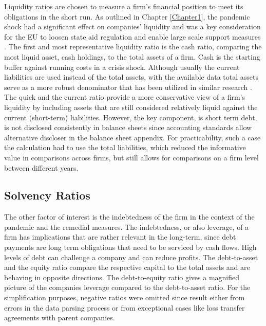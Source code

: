 Liquidity ratios are chosen to measure a firm's financial position to meet its obligations in the short run. As outlined in Chapter \ref{Chapter1}, the pandemic shock had a significant effect on companies' liquidity and was a key consideration for the EU to loosen state aid regulation and enable large scale support measures \parencite{eu_com_temporary_2020}. The first and most representative liquidity ratio is the cash ratio, comparing the most liquid asset, cash holdings, to the total assets of a firm. Cash is the starting buffer against running costs in a crisis shock. Although usually the current liabilities are used instead of the total assets, with the available data total assets serve as a more robust denominator that has been utilized in similar research \parencite{fernandez-cerezo_firm-level_2021, costa_state-aids_2021,igan_shot_2023}. The quick and the current ratio provide a more conservative view of a firm's liquidity by including assets that are still considered relatively liquid against the current (short-term) liabilities. However, the key component, is short term debt, is not disclosed consistently in balance sheets since accounting standards allow alternative discloser in the balance sheet appendix. For practicability, such a case the calculation had to use the total liabilities, which reduced the informative value in comparisons across firms, but still allows for comparisons on a firm level between different years.

\subsection{Solvency Ratios}

The other factor of interest is the indebtedness of the firm in the context of the pandemic and the remedial measures. The indebtedness, or also leverage, of a firm has implications that are rather relevant in the long-term, since debt payments are long term obligations that need to be serviced by cash flows. High levels of debt can challenge a company and can reduce profits. 
The debt-to-asset and the equity ratio compare the respective capital to the total assets and are behaving in opposite directions. The debt-to-equity ratio gives a magnified picture of the companies leverage compared to the debt-to-asset ratio. For the simplification purposes, negative ratios were omitted since result either from errors in the data parsing process or from exceptional cases like loss transfer agreements with parent companies. 

